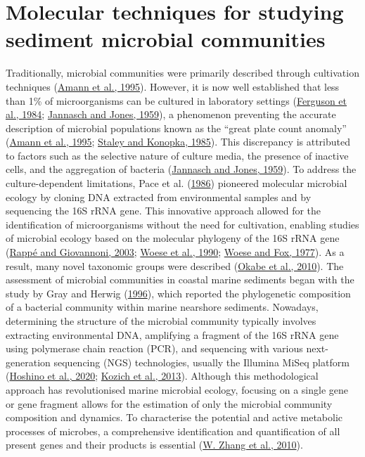 \documentclass[
  12 pt,
]{book}
\begin{document}
\hypertarget{molecular-techniques-for-studying-sediment-microbial-communities}{%
\section{Molecular techniques for studying sediment microbial communities}\label{molecular-techniques-for-studying-sediment-microbial-communities}}

Traditionally, microbial communities were primarily described through cultivation techniques (\protect\hyperlink{ref-Amann1995}{Amann et al., 1995}). However, it is now well established that less than 1\si{\percent} of microorganisms can be cultured in laboratory settings (\protect\hyperlink{ref-Ferguson1984}{Ferguson et al., 1984}; \protect\hyperlink{ref-Jannasch1959}{Jannasch and Jones, 1959}), a phenomenon preventing the accurate description of microbial populations known as the ``great plate count anomaly'' (\protect\hyperlink{ref-Amann1995}{Amann et al., 1995}; \protect\hyperlink{ref-Staley1985}{Staley and Konopka, 1985}). This discrepancy is attributed to factors such as the selective nature of culture media, the presence of inactive cells, and the aggregation of bacteria (\protect\hyperlink{ref-Jannasch1959}{Jannasch and Jones, 1959}). To address the culture-dependent limitations, Pace et al. (\protect\hyperlink{ref-Pace1986}{1986}) pioneered molecular microbial ecology by cloning DNA extracted from environmental samples and by sequencing the 16S rRNA gene. This innovative approach allowed for the identification of microorganisms without the need for cultivation, enabling studies of microbial ecology based on the molecular phylogeny of the 16S rRNA gene (\protect\hyperlink{ref-Rappe2003}{Rappé and Giovannoni, 2003}; \protect\hyperlink{ref-Woese1990}{Woese et al., 1990}; \protect\hyperlink{ref-Woese1977}{Woese and Fox, 1977}). As a result, many novel taxonomic groups were described (\protect\hyperlink{ref-Okabe2010}{Okabe et al., 2010}). The assessment of microbial communities in coastal marine sediments began with the study by Gray and Herwig (\protect\hyperlink{ref-Gray1996}{1996}), which reported the phylogenetic composition of a bacterial community within marine nearshore sediments. Nowadays, determining the structure of the microbial community typically involves extracting environmental DNA, amplifying a fragment of the 16S rRNA gene using polymerase chain reaction (PCR), and sequencing with various next-generation sequencing (NGS) technologies, usually the Illumina MiSeq platform (\protect\hyperlink{ref-Hoshino2020}{Hoshino et al., 2020}; \protect\hyperlink{ref-Kozich2013}{Kozich et al., 2013}). Although this methodological approach has revolutionised marine microbial ecology, focusing on a single gene or gene fragment allows for the estimation of only the microbial community composition and dynamics. To characterise the potential and active metabolic processes of microbes, a comprehensive identification and quantification of all present genes and their products is essential (\protect\hyperlink{ref-Zhang2010}{W. Zhang et al., 2010}).
\end{document}
